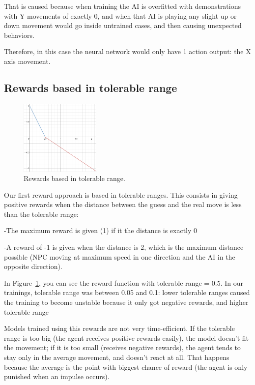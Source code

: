 That is caused because when training the AI is overfitted with demonstrations with Y movements of exactly 0, and when that AI is playing any slight up or down movement would go inside untrained cases, and then causing unexpected behaviors.

Therefore, in this case the neural network would only have 1 action output: the X axis movement.

\subsection{Rewards based in tolerable range}
\label{sec:tolrange}

\begin{figure}
    \centering
    \includegraphics[width=0.35\textwidth]{img/rewTR.png}
		\caption{Rewards based in tolerable range.}
		\label{fig:trange}
\end{figure}

Our first reward approach is based in tolerable ranges. This consists in giving positive rewards when the distance between the guess and the real move is less than the tolerable range:

-The maximum reward is given (1) if it the distance is exactly 0

-A reward of -1 is given when the distance is 2, which is the maximum distance possible (NPC moving at maximum speed in one direction and the AI in the opposite direction).

In Figure~\ref{fig:trange}, you can see the reward function with tolerable range = 0.5. In our trainings, tolerable range was between 0.05 and 0.1: lower tolerable ranges caused the training to become unstable because it only got negative rewards, and higher tolerable range

Models trained using this rewards are not very time-efficient. If the tolerable range is too big (the agent receives positive rewards easily), the model doesn't fit the movement; if it is too small (receives negative rewards), the agent tends to stay only in the average movement, and doesn't react at all. That happens because the average is the point with biggest chance of reward (the agent is only punished when an impulse occurs). 

